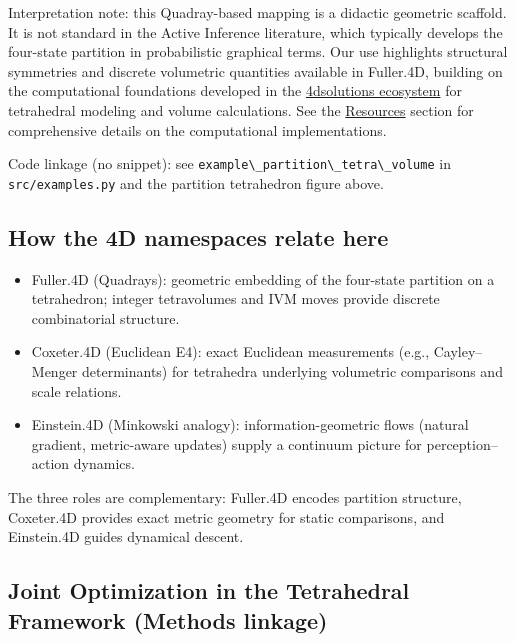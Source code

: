 \documentclass[
  10pt,
]{article}
\newcommand{\passthrough}[1]{#1}
\providecommand{\tightlist}{%
  \setlength{\itemsep}{0pt}\setlength{\parskip}{0pt}}
\begin{document}
Interpretation note: this Quadray-based mapping is a didactic geometric
scaffold. It is not standard in the Active Inference literature, which
typically develops the four-state partition in probabilistic graphical
terms. Our use highlights structural symmetries and discrete volumetric
quantities available in Fuller.4D, building on the computational
foundations developed in the
\href{https://github.com/4dsolutions}{4dsolutions ecosystem} for
tetrahedral modeling and volume calculations. See the
\href{07_resources.md}{Resources} section for comprehensive details on
the computational implementations.

Code linkage (no snippet): see
\passthrough{\lstinline!example\_partition\_tetra\_volume!} in
\passthrough{\lstinline!src/examples.py!} and the partition tetrahedron
figure above.

\hypertarget{how-the-4d-namespaces-relate-here}{%
\subsection{How the 4D namespaces relate
here}\label{how-the-4d-namespaces-relate-here}}

\begin{itemize}
\tightlist
\item
  Fuller.4D (Quadrays): geometric embedding of the four-state partition
  on a tetrahedron; integer tetravolumes and IVM moves provide discrete
  combinatorial structure.
\item
  Coxeter.4D (Euclidean E4): exact Euclidean measurements (e.g.,
  Cayley--Menger determinants) for tetrahedra underlying volumetric
  comparisons and scale relations.
\item
  Einstein.4D (Minkowski analogy): information-geometric flows (natural
  gradient, metric-aware updates) supply a continuum picture for
  perception--action dynamics.
\end{itemize}

The three roles are complementary: Fuller.4D encodes partition
structure, Coxeter.4D provides exact metric geometry for static
comparisons, and Einstein.4D guides dynamical descent.

\hypertarget{joint-optimization-in-the-tetrahedral-framework-methods-linkage}{%
\subsection{Joint Optimization in the Tetrahedral Framework (Methods
linkage)}\label{joint-optimization-in-the-tetrahedral-framework-methods-linkage}}
\end{document}
